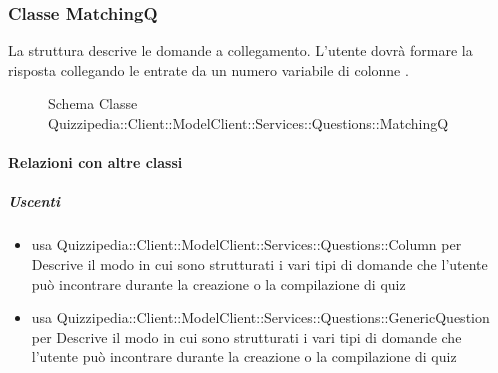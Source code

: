 \subsubsection{Classe MatchingQ}
La struttura descrive le domande a collegamento. L'utente dovrà formare la risposta collegando le entrate da un numero variabile di colonne .
\begin{figure}[H]
\centering
\noindent{}
\caption[Schema Classe MatchingQ]{Schema Classe Quizzipedia::Client::ModelClient::Services::Questions::MatchingQ}
\end{figure}
\paragraph{Relazioni con altre classi}
\subparagraph{Uscenti}
\begin{itemize}
\item usa Quizzipedia::Client::ModelClient::Services::Questions::Column per Descrive il modo in cui sono strutturati i vari tipi di domande che l'utente può incontrare durante la creazione o la compilazione di quiz
\item usa Quizzipedia::Client::ModelClient::Services::Questions::GenericQuestion per Descrive il modo in cui sono strutturati i vari tipi di domande che l'utente può incontrare durante la creazione o la compilazione di quiz
\end{itemize}
